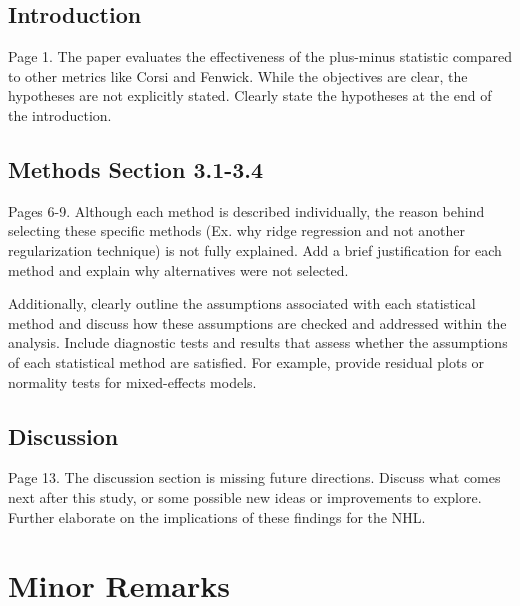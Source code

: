 \documentclass[a4paper,9pt]{scrartcl}
\begin{document}
\subsection{Introduction}
Page 1. The paper evaluates the effectiveness of the plus-minus statistic compared to other metrics like Corsi and Fenwick. While the objectives are clear, the hypotheses are not explicitly stated. Clearly state the hypotheses at the end of the introduction.

\subsection{Methods Section 3.1-3.4}
Pages 6-9. Although each method is described individually, the reason behind selecting these specific methods (Ex. why ridge regression and not another regularization technique) is not fully explained. Add a brief justification for each method and explain why alternatives were not selected. 

Additionally, clearly outline the assumptions associated with each statistical method and discuss how these assumptions are checked and addressed within the analysis. Include diagnostic tests and results that assess whether the assumptions of each statistical method are satisfied. For example, provide residual plots or normality tests for mixed-effects models. 
 

\subsection{Discussion}
Page 13.  The discussion section is missing future directions. Discuss what comes next after this study, or some possible new ideas or improvements to explore. Further elaborate on the implications of these findings for the NHL. 

\section{Minor Remarks}
\end{document}
